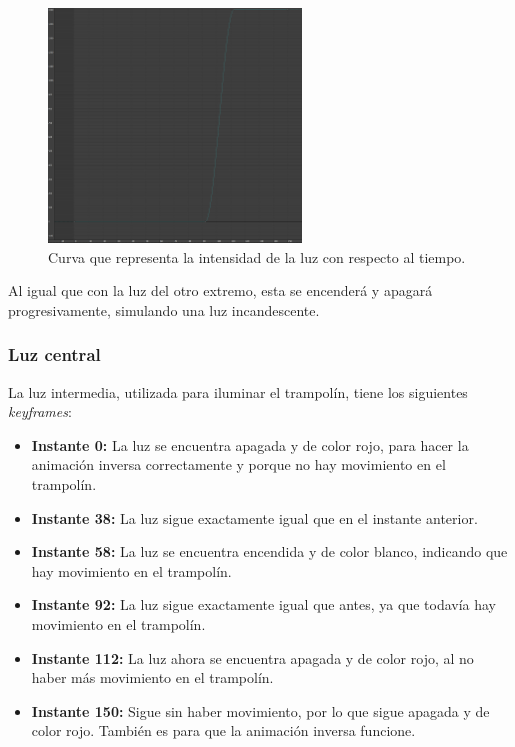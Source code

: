 \begin{figure}[H]
   \centering
   \includegraphics[width=0.6\textwidth]{imagenes/curvas/LR/intensity.png}
   \caption{Curva que representa la intensidad de la luz con respecto al tiempo.}
\end{figure}

Al igual que con la luz del otro extremo, esta se encenderá y apagará progresivamente, simulando una luz incandescente.


\subsubsection{Luz central}

La luz intermedia, utilizada para iluminar el trampolín, tiene los siguientes \textit{keyframes}:

\begin{itemize}
   \item \textbf{Instante 0: }La luz se encuentra apagada y de color rojo, para hacer la animación inversa correctamente y porque no hay movimiento en el trampolín.
   \item \textbf{Instante 38: }La luz sigue exactamente igual que en el instante anterior.
   \item \textbf{Instante 58: }La luz se encuentra encendida y de color blanco, indicando que hay movimiento en el trampolín.
   \item \textbf{Instante 92: }La luz sigue exactamente igual que antes, ya que todavía hay movimiento en el trampolín.
   \item \textbf{Instante 112: }La luz ahora se encuentra apagada y de color rojo, al no haber más movimiento en el trampolín.
   \item \textbf{Instante 150: }Sigue sin haber movimiento, por lo que sigue apagada y de color rojo. También es para que la animación inversa funcione.
\end{itemize}

